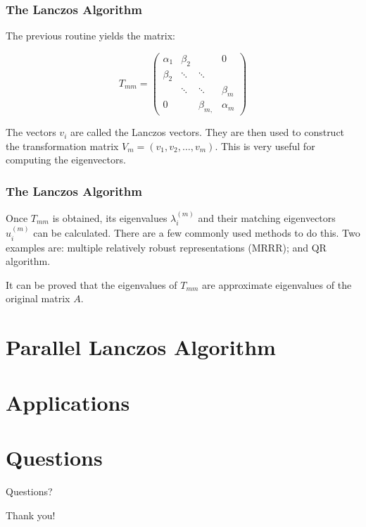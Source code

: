 \documentclass[pdf]{beamer}
\begin{document}
\begin{frame}
\frametitle{The Lanczos Algorithm}

The previous routine yields the matrix:

\[ T_{mm} = \left( \begin{array}{cccc}
\alpha_1 & \beta_{2} & & 0\\
\beta_{2} & \ddots &\ddots & \\
& \ddots & \ddots & \beta_{m} \\
0 & & \beta_{m,} & \alpha_m \end{array} \right) \]

The vectors $v_i$ are called the Lanczos vectors. They are then used to construct the transformation matrix $V_m=(v_1,v_2,\dots,v_m)$. This is very useful for computing the eigenvectors.

\end{frame}


\begin{frame}
\frametitle{The Lanczos Algorithm}

Once $T_{mm}$ is obtained, its eigenvalues $\lambda^(m)_i$ and their matching eigenvectors $u^(m)_i$ can be calculated. There are a few commonly used methods to do this. Two examples are: multiple relatively robust representations (MRRR); and QR algorithm.

It can be proved that the eigenvalues of $T_{mm}$ are approximate eigenvalues of the original matrix $A$.


\end{frame}





\section{Parallel Lanczos Algorithm}

\begin{frame}
\tableofcontents[currentsection]
\end{frame}

\begin{frame}


\end{frame}




\section{Applications}

\begin{frame}
\tableofcontents[currentsection]
\end{frame}


\section{Questions}

\begin{frame}
\tableofcontents[currentsection]
\end{frame}

\begin{frame}
\centering
Questions?
\end{frame}

\begin{frame}
\centering
Thank you!
\end{frame}
\end{document}
